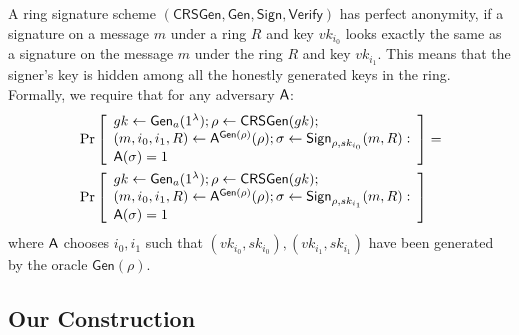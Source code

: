 \begin{definition}
A ring signature scheme
$(\mathsf{CRSGen},\allowbreak \mathsf{Gen},\allowbreak \mathsf{Sign}, \mathsf{Verify})$ has perfect anonymity, if a signature on a message
$m$ under a ring $R$ and key $vk_{i_0}$
looks exactly the same as a signature on the
message $m$ under the ring $R$ and key $vk_{i_1}$. This means that the signer's key is hidden
among all the honestly generated keys in the ring. Formally, we require that for any
adversary $\mathsf{A}$:
\begin{align*}
&\Pr\left[\begin{array}{l}
gk\gets\mathsf{Gen}_a(1^\lambda);\rho\gets\mathsf{CRSGen}(gk);\\
(m,i_0,i_1,R)\gets\mathsf{A}^{\mathsf{Gen}(\rho)}(\rho);\sigma\gets\mathsf{Sign}_{\rho,sk_{i_0}}(m,R):\\
\mathsf{A}(\sigma)=1
\end{array}\right]
=\\
&\Pr\left[\begin{array}{l}
gk\gets\mathsf{Gen}_a(1^\lambda);\rho\gets\mathsf{CRSGen}(gk);\\
(m,i_0,i_1,R)\gets\mathsf{A}^{\mathsf{Gen}(\rho)}(\rho);\sigma\gets\mathsf{Sign}_{\rho,sk_{i_1}}(m,R):\\
\mathsf{A}(\sigma)=1
\end{array}\right]
\end{align*}
where $\mathsf{A}$ chooses $i_0, i_1$ such that $(vk_{i_0}, sk_{i_0}),(vk_{i_1}, sk_{i_1})$ have been generated by the
oracle $\mathsf{Gen(\rho)}$.
\end{definition}

\subsection{Our Construction}

